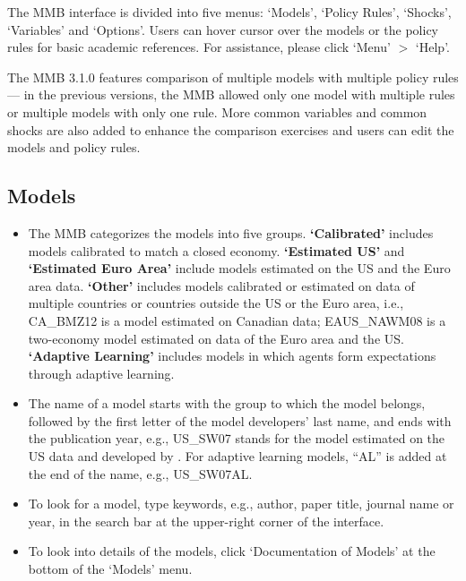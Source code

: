 \documentclass[10pt,a4paper]{article}
\begin{document}
The MMB interface is divided into five menus: ‘Models’, ‘Policy Rules’, ‘Shocks’, ‘Variables’ and ‘Options’. Users can hover cursor over the models or the policy rules for basic academic references. For assistance, please click ‘Menu’ $ > $ ‘Help’.
\medskip

The MMB 3.1.0 features comparison of multiple models with multiple policy rules — in the previous versions, the MMB allowed only one model with multiple rules or multiple models with only one rule. More common variables and common shocks are also added to enhance the comparison exercises and users can edit the models and policy rules.
\bigskip
\bigskip

\subsection{Models}
\label{sec:Models}
\medskip

\begin{itemize}
\item The MMB categorizes the models into five groups. \textbf{‘Calibrated’} includes models calibrated to match a closed economy. \textbf{‘Estimated US’} and \textbf{‘Estimated Euro Area’} include models estimated on the US and the Euro area data. \textbf{‘Other’} includes models calibrated or estimated on data of multiple countries or countries outside the US or the Euro area, i.e., CA\_BMZ12 is a model estimated on Canadian data; EAUS\_NAWM08 is a two-economy model estimated on data of the Euro area and the US. \textbf{‘Adaptive Learning’} includes models in which agents form expectations through adaptive learning.

\item The name of a model starts with the group to which the model belongs, followed by the first letter of the model developers’ last name, and ends with the publication year, e.g., US\_SW07 stands for the model estimated on the US data and developed by \cite{SmetsWouters2007}. For adaptive learning models, “AL” is added at the end of the name, e.g., US\_SW07AL.

\item To look for a model, type keywords, e.g., author, paper title, journal name or year, in the search bar at the upper-right corner of the interface.

\item To look into details of the models, click ‘Documentation of Models’ at the bottom of the ‘Models’ menu.
\end{itemize}
\end{document}
